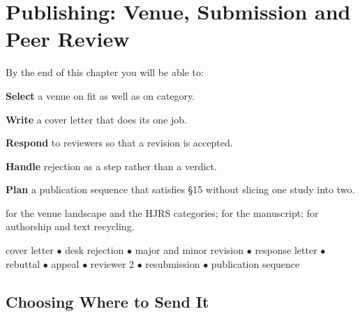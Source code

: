 \chapter{Publishing: Venue, Submission and Peer Review}\label{ch:publishing}

\begin{outcomes}
By the end of this chapter you will be able to:
\begin{tight}
  \item \textbf{Select} a venue on fit as well as on category.
  \item \textbf{Write} a cover letter that does its one job.
  \item \textbf{Respond} to reviewers so that a revision is accepted.
  \item \textbf{Handle} rejection as a step rather than a verdict.
  \item \textbf{Plan} a publication sequence that satisfies \S15 without
    slicing one study into two.
\end{tight}
\end{outcomes}

\begin{prereq}
 for the venue landscape and the HJRS categories;
 for the manuscript;  for authorship and text
recycling.
\end{prereq}

\begin{keyterms}
cover letter $\bullet$ desk rejection $\bullet$ major and minor revision
$\bullet$ response letter $\bullet$ rebuttal $\bullet$ appeal $\bullet$
reviewer 2 $\bullet$ resubmission $\bullet$ publication sequence
\end{keyterms}

\section{Choosing Where to Send It}

